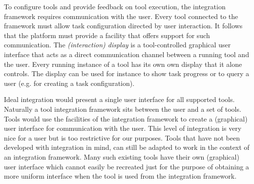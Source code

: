 \documentclass{article}
\begin{document}
   To configure tools and provide feedback on tool execution, the integration
   framework requires communication with the user. Every tool connected to the
   framework must allow task configuration directed by user interaction. It
   follows that the platform must provide a facility that offers support for
   such communication.  The \textit{(interaction) display} is a tool-controlled
   graphical user interface that acts as a direct communication channel between
   a running tool and the user. Every running instance of a tool has its own
   own display that it alone controls. The display can be used for instance to
   show task progress or to query a user (e.g. for creating a task
   configuration).

   Ideal integration would present a single user interface for all supported
   tools. Naturally a tool integration framework sits between the user and a
   set of tools. Tools would use the facilities of the integration framework to
   create a (graphical) user interface for communication with the user. This
   level of integration is very nice for a user but is too restrictive for our
   purposes.  Tools that have not been developed with integration in mind, can
   still be adapted to work in the context of an integration framework.  Many
   such existing tools have their own (graphical) user interface which cannot
   easily be recreated just for the purpose of obtaining a more uniform
   interface when the tool is used from the integration framework.


\end{document}
